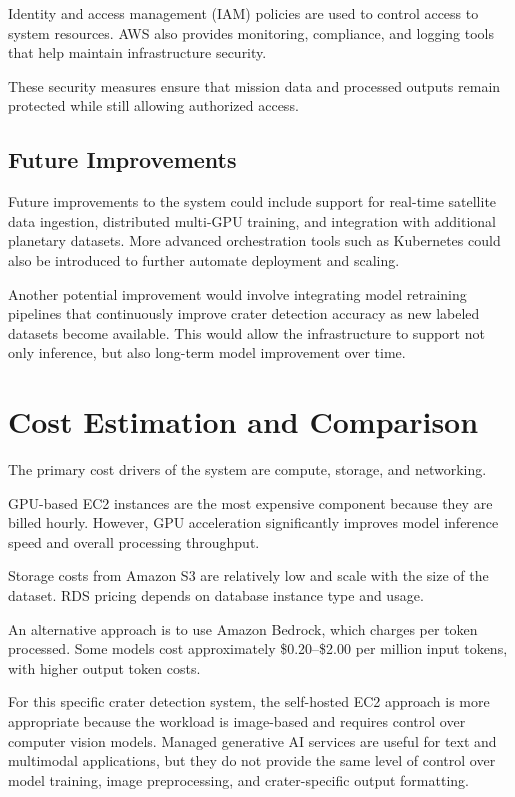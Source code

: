 \documentclass[conference]{IEEEtran}
\begin{document}
	Identity and access management (IAM) policies are used to control access to system resources. AWS also provides monitoring, compliance, and logging tools that help maintain infrastructure security.
	
	These security measures ensure that mission data and processed outputs remain protected while still allowing authorized access.
	
	\subsection{Future Improvements}
	
	Future improvements to the system could include support for real-time satellite data ingestion, distributed multi-GPU training, and integration with additional planetary datasets. More advanced orchestration tools such as Kubernetes could also be introduced to further automate deployment and scaling.
	
	Another potential improvement would involve integrating model retraining pipelines that continuously improve crater detection accuracy as new labeled datasets become available. This would allow the infrastructure to support not only inference, but also long-term model improvement over time.
	
	\section{Cost Estimation and Comparison}
	
	The primary cost drivers of the system are compute, storage, and networking.
	
	GPU-based EC2 instances are the most expensive component because they are billed hourly. However, GPU acceleration significantly improves model inference speed and overall processing throughput.
	
	Storage costs from Amazon S3 are relatively low and scale with the size of the dataset. RDS pricing depends on database instance type and usage.
	
	An alternative approach is to use Amazon Bedrock, which charges per token processed. Some models cost approximately \$0.20--\$2.00 per million input tokens, with higher output token costs.
	
	For this specific crater detection system, the self-hosted EC2 approach is more appropriate because the workload is image-based and requires control over computer vision models. Managed generative AI services are useful for text and multimodal applications, but they do not provide the same level of control over model training, image preprocessing, and crater-specific output formatting.
	
\end{document}
